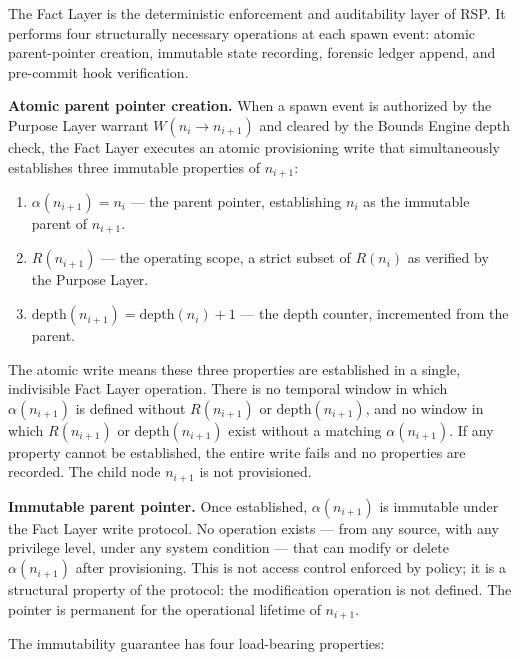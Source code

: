 The Fact Layer is the deterministic enforcement and auditability layer of RSP. It performs four structurally necessary operations at each spawn event: atomic parent-pointer creation, immutable state recording, forensic ledger append, and pre-commit hook verification.

\medskip
\noindent\textbf{Atomic parent pointer creation.} When a spawn event is authorized by the Purpose Layer warrant $W(n_i \to n_{i+1})$ and cleared by the Bounds Engine depth check, the Fact Layer executes an atomic provisioning write that simultaneously establishes three immutable properties of $n_{i+1}$:

\begin{enumerate}
    \item[(F1)] $\alpha(n_{i+1}) = n_i$ --- the parent pointer, establishing $n_i$ as the immutable parent of $n_{i+1}$.
    \item[(F2)] $R(n_{i+1})$ --- the operating scope, a strict subset of $R(n_i)$ as verified by the Purpose Layer.
    \item[(F3)] $\mathrm{depth}(n_{i+1}) = \mathrm{depth}(n_i) + 1$ --- the depth counter, incremented from the parent.
\end{enumerate}

The atomic write means these three properties are established in a single, indivisible Fact Layer operation. There is no temporal window in which $\alpha(n_{i+1})$ is defined without $R(n_{i+1})$ or $\mathrm{depth}(n_{i+1})$, and no window in which $R(n_{i+1})$ or $\mathrm{depth}(n_{i+1})$ exist without a matching $\alpha(n_{i+1})$. If any property cannot be established, the entire write fails and no properties are recorded. The child node $n_{i+1}$ is not provisioned.

\medskip
\noindent\textbf{Immutable parent pointer.} Once established, $\alpha(n_{i+1})$ is immutable under the Fact Layer write protocol. No operation exists --- from any source, with any privilege level, under any system condition --- that can modify or delete $\alpha(n_{i+1})$ after provisioning. This is not access control enforced by policy; it is a structural property of the protocol: the modification operation is not defined. The pointer is permanent for the operational lifetime of $n_{i+1}$.

The immutability guarantee has four load-bearing properties:

